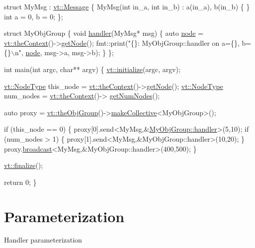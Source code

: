 \begin{DoxyCodeInclude}
\textcolor{keyword}{struct }MyMsg : \hyperlink{structvt_1_1messaging_1_1_active_msg}{vt::Message} \{
  MyMsg(\textcolor{keywordtype}{int} in\_a, \textcolor{keywordtype}{int} in\_b) : a(in\_a), b(in\_b) \{ \}
  \textcolor{keywordtype}{int} a = 0, b = 0;
\};

\textcolor{keyword}{struct }MyObjGroup \{
  \textcolor{keywordtype}{void} \hyperlink{namespacevt_1_1config_a6bd1d6215bda0d8ca02811798399f689a82a0081a94d5c5dfd18b0b3f7eca64b7}{handler}(MyMsg* msg) \{
    \textcolor{keyword}{auto} \hyperlink{namespacevt_1_1config_a46e57c33bee1b9f1fa95455af86d80e0a576033c81e2ddd03d721ecef3b1b3f81}{node} = \hyperlink{namespacevt_a26551fe0e6e6a1371111df5b12c7e92c}{vt::theContext}()->\hyperlink{structvt_1_1ctx_1_1_context_a0d52c263ce8516546a67443d9a86fa5f}{getNode}();
    fmt::print(\textcolor{stringliteral}{"\{\}: MyObjGroup::handler on a=\{\}, b=\{\}\(\backslash\)n"}, \hyperlink{namespacevt_1_1config_a46e57c33bee1b9f1fa95455af86d80e0a576033c81e2ddd03d721ecef3b1b3f81}{node}, msg->a, msg->b);
  \}
\};

\textcolor{keywordtype}{int} main(\textcolor{keywordtype}{int} argc, \textcolor{keywordtype}{char}** argv) \{
  \hyperlink{namespacevt_aae6ab5af3e11886ce73c4c3ffa008201}{vt::initialize}(argc, argv);

  \hyperlink{namespacevt_a866da9d0efc19c0a1ce79e9e492f47e2}{vt::NodeType} this\_node = \hyperlink{namespacevt_a26551fe0e6e6a1371111df5b12c7e92c}{vt::theContext}()->\hyperlink{structvt_1_1ctx_1_1_context_a0d52c263ce8516546a67443d9a86fa5f}{getNode}();
  \hyperlink{namespacevt_a866da9d0efc19c0a1ce79e9e492f47e2}{vt::NodeType} num\_nodes = \hyperlink{namespacevt_a26551fe0e6e6a1371111df5b12c7e92c}{vt::theContext}()->
      \hyperlink{structvt_1_1ctx_1_1_context_a7f41071aadf6d5fa9e1b6c703c5ff19d}{getNumNodes}();

  \textcolor{keyword}{auto} proxy = \hyperlink{namespacevt_a833f0115b692f578167cbd88e30d39c5}{vt::theObjGroup}()->\hyperlink{structvt_1_1objgroup_1_1_obj_group_manager_a651c44a47c6bcdc9f1b6c9e857fa03f2}{makeCollective}<MyObjGroup>();

  \textcolor{keywordflow}{if} (this\_node == 0) \{
    proxy[0].send<MyMsg,&\hyperlink{namespacevt_1_1config_a6bd1d6215bda0d8ca02811798399f689a82a0081a94d5c5dfd18b0b3f7eca64b7}{MyObjGroup::handler}>(5,10);
    \textcolor{keywordflow}{if} (num\_nodes > 1) \{
      proxy[1].send<MyMsg,&MyObjGroup::handler>(10,20);
    \}
    proxy.\hyperlink{structvt_1_1objgroup_1_1proxy_1_1_proxy_a0b716ca776b1f06e0d7d45afbe9e5274}{broadcast}<MyMsg,&MyObjGroup::handler>(400,500);
  \}

  \hyperlink{namespacevt_a540d90dbd6e97b69f1dcbc9ee9314cff}{vt::finalize}();

  \textcolor{keywordflow}{return} 0;
\}
\end{DoxyCodeInclude}
\hypertarget{param}{}\section{Parameterization}\label{param}
Handler parameterization

